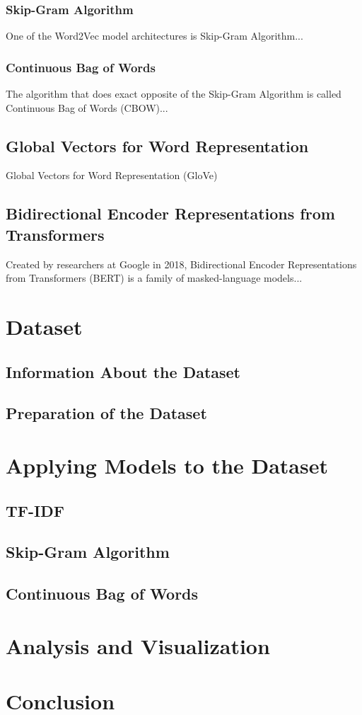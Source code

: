 \documentclass[man]{apa7}
\begin{document}
\subsubsection{Skip-Gram Algorithm}
One of the Word2Vec model architectures is Skip-Gram Algorithm...
\subsubsection{Continuous Bag of Words}
The algorithm that does exact opposite of the Skip-Gram Algorithm is called Continuous Bag of Words (CBOW)...
\subsection{Global Vectors for Word Representation}
Global Vectors for Word Representation (GloVe)
\subsection{Bidirectional Encoder Representations from Transformers}
Created by researchers at Google in 2018, Bidirectional Encoder Representations from Transformers (BERT) is a family of masked-language models...
\section{Dataset}
\lipsum[0-1]
\subsection{Information About the Dataset}
\lipsum[0-1]
\subsection{Preparation of the Dataset}
\lipsum[0-1]
\section{Applying Models to the Dataset}
\lipsum[0-1]
\subsection{TF-IDF}
\lipsum[0-1]
\subsection{Skip-Gram Algorithm}
\lipsum[0-1]
\subsection{Continuous Bag of Words}
\lipsum[0-1]
\section{Analysis and Visualization}
\section{Conclusion}
\lipsum[0-1]
\end{document}
